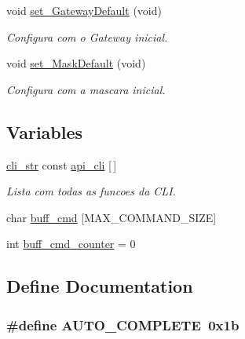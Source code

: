 \begin{DoxyCompactItemize}
void \hyperlink{group__CLI_gac548b8fa3585f3a56498153281b68db8}{set\_\-GatewayDefault} (void)
\begin{DoxyCompactList}\small\item\em Configura com o Gateway inicial. \item\end{DoxyCompactList}\item 
void \hyperlink{group__CLI_ga595578a069e4bda66aa7f801f3d19899}{set\_\-MaskDefault} (void)
\begin{DoxyCompactList}\small\item\em Configura com a mascara inicial. \item\end{DoxyCompactList}\end{DoxyCompactItemize}
\subsection*{Variables}
\begin{DoxyCompactItemize}
\item 
\hyperlink{structcli__str}{cli\_\-str} const \hyperlink{group__CLI_ga98f1d676d13f3f00c5ffc7b94a4f4ae1}{api\_\-cli} \mbox{[}$\,$\mbox{]}
\begin{DoxyCompactList}\small\item\em Lista com todas as funcoes da CLI. \item\end{DoxyCompactList}\item 
char \hyperlink{group__CLI_gae9fba632af0bc2e0d51efda2768bbc98}{buff\_\-cmd} \mbox{[}MAX\_\-COMMAND\_\-SIZE\mbox{]}
\item 
int \hyperlink{group__CLI_ga559568f2d8d01bc809c6b12c2f214a5f}{buff\_\-cmd\_\-counter} = 0
\end{DoxyCompactItemize}


\subsection{Define Documentation}
\hypertarget{group__CLI_ga174d68ea31b56b93d67f549520156b82}{
\subsubsection[{AUTO\_\-COMPLETE}]{\setlength{\rightskip}{0pt plus 5cm}\#define AUTO\_\-COMPLETE~0x1b}}
\label{group__CLI_ga174d68ea31b56b93d67f549520156b82}


